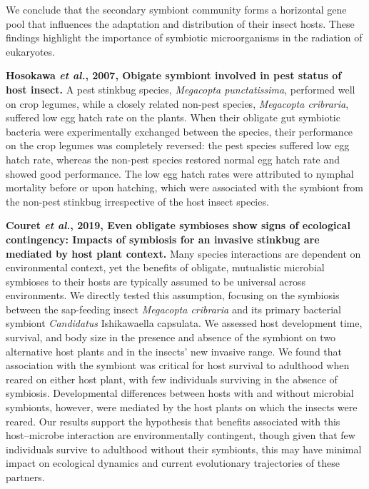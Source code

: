 \documentclass[11pt]{article}
\begin{document}
\begin{sloppypar}
We conclude that the secondary symbiont community forms a horizontal gene pool that influences the adaptation and distribution of their insect hosts. 
These findings highlight the importance of symbiotic microorganisms in the radiation of eukaryotes.
\par
\textbf{Hosokawa \textit{et al.}, 2007, Obigate symbiont involved in pest status of host insect.} \newline
A pest stinkbug species, \textit{Megacopta punctatissima}, performed well on crop legumes, while a closely related non-pest species, \textit{Megacopta cribraria}, suffered low egg hatch rate on the plants. 
When their obligate gut symbiotic bacteria were experimentally exchanged between the species, their performance on the crop legumes was completely reversed: 
the pest species suffered low egg hatch rate, whereas the non-pest species restored normal egg hatch rate and showed good performance. 
The low egg hatch rates were attributed to nymphal mortality before or upon hatching, which were associated with the symbiont from the non-pest stinkbug irrespective of the host insect species.
\par
\textbf{Couret \textit{et al.}, 2019, Even obligate symbioses show signs of ecological contingency: Impacts of symbiosis for an invasive stinkbug are mediated by host plant context.} \newline
Many species interactions are dependent on environmental context, yet the benefits of obligate, mutualistic microbial symbioses to their hosts are typically assumed to be universal across environments. 
We directly tested this assumption, focusing on the symbiosis between the sap-feeding insect \textit{Megacopta cribraria} and its primary bacterial symbiont \textit{Candidatus} Ishikawaella capsulata. 
We assessed host development time, survival, and body size in the presence and absence of the symbiont on two alternative host plants and in the insects' new invasive range. 
We found that association with the symbiont was critical for host survival to adulthood when reared on either host plant, with few individuals surviving in the absence of symbiosis. 
Developmental differences between hosts with and without microbial symbionts, however, were mediated by the host plants on which the insects were reared. 
Our results support the hypothesis that benefits associated with this host–microbe interaction are environmentally contingent, though given that few individuals survive to adulthood without their symbionts, this may have minimal impact on ecological dynamics and current evolutionary trajectories of these partners.

\end{sloppypar}
\end{document}
